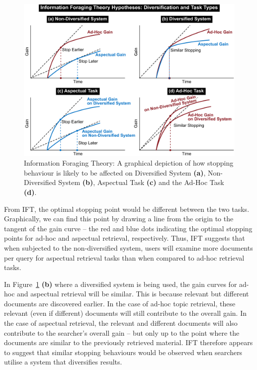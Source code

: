 \begin{figure}[t!]
\begin{center}
        \includegraphics[width=\textwidth]{figures/ift-non-div-fromthesis.pdf}
        \vspace{-2mm}
    \caption{Information Foraging Theory: A graphical depiction of how stopping behaviour is likely to be affected on Diversified System \textbf{(a)}, Non-Diversified System \textbf{(b)}, Aspectual Task \textbf{(c)} and the Ad-Hoc Task \textbf{(d)}.} \label{fig_ift_patches}    
    \vspace{-6mm}
\end{center}
\end{figure}


From IFT, the optimal stopping point would be different between the two tasks. Graphically, we can find this point by drawing a line from the origin to the tangent of the gain curve -- the red and blue dots indicating the optimal stopping points for ad-hoc and aspectual retrieval, respectively. Thus, IFT suggests that when subjected to the non-diversified system, users will examine more documents per query for aspectual retrieval tasks than when compared to ad-hoc retrieval tasks.

In Figure~\ref{fig_ift_patches} \textbf{(b)} where a diversified system is being used, the gain curves for ad-hoc and aspectual retrieval will be similar. This is because relevant but different documents are discovered earlier. In the case of ad-hoc topic retrieval, these relevant (even if different) documents will still contribute to the overall gain. In the case of aspectual retrieval, the relevant and different documents will also contribute to the searcher's overall gain -- but only up to the point where the documents are similar to the previously retrieved material. IFT therefore appears to suggest that similar stopping behaviours would be observed when searchers utilise a system that diversifies results.

